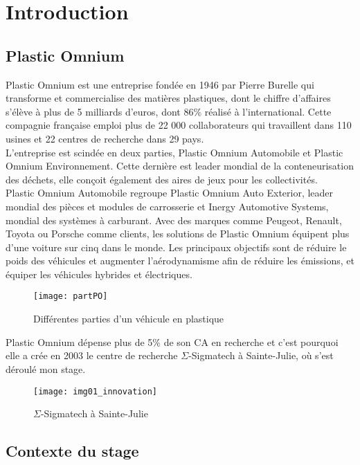 \chapter*{Introduction}
\section*{Plastic Omnium}

Plastic Omnium est une entreprise fondée en 1946 par Pierre Burelle qui transforme et commercialise des matières plastiques, dont le chiffre d'affaires s'élève à plus de 5 milliards d'euros, dont 86\% réalisé à l'international. Cette compagnie française emploi plus de 22 000 collaborateurs qui travaillent dans 110 usines et 22 centres de recherche dans 29 pays.\\

L'entreprise est scindée en deux parties, Plastic Omnium Automobile et Plastic Omnium Environnement. Cette dernière est leader mondial de la conteneurisation des déchets, elle conçoit également des aires de jeux pour les collectivités.\\
Plastic Omnium Automobile regroupe Plastic Omnium Auto Exterior, leader mondial des pièces et modules de carrosserie et Inergy Automotive Systems,  mondial des systèmes à carburant. Avec des marques comme Peugeot, Renault, Toyota ou Porsche comme clients, les solutions de Plastic Omnium équipent plus d'une voiture sur cinq dans le monde. Les principaux objectifs sont de réduire le poids des véhicules et augmenter l'aérodynamisme afin de réduire les émissions, et équiper les véhicules hybrides et électriques. \\

\begin{figure}[H]
\centering
\texttt{[image: partPO]}
\caption{Différentes parties d'un véhicule en plastique}
\end{figure}

Plastic Omnium dépense plus de 5\% de son CA en recherche et c'est pourquoi elle a crée en 2003 le centre de recherche $\Sigma$-Sigmatech à Sainte-Julie, où s'est déroulé mon stage.\\

\begin{figure}[H]
\centering
\texttt{[image: img01\_innovation]}
\caption{$\Sigma$-Sigmatech à Sainte-Julie}
\end{figure}

\section*{Contexte du stage}

